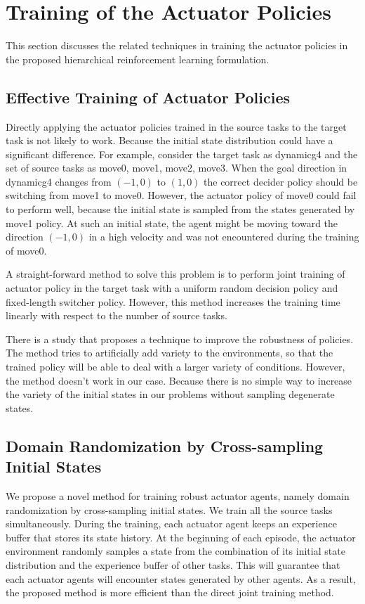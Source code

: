 \section{Training of the Actuator Policies}
This section discusses the related techniques in training the actuator policies in the proposed hierarchical reinforcement learning formulation.
\subsection{Effective Training of Actuator Policies}
Directly applying the actuator policies trained in the source tasks to the target task is not likely to work. Because the initial state distribution could have a significant difference.
For example, consider the target task as dynamicg4 and the set of source tasks as move0, move1, move2, move3. When the goal direction in dynamicg4 changes from $(-1,0)$ to $(1,0)$ the correct decider policy should be switching from move1 to move0. However, the actuator policy of move0 could fail to perform well, because the initial state is sampled from the states generated by move1 policy. At such an initial state, the agent might be moving toward the direction $(-1,0)$ in a high velocity and was not encountered during the training of move0.

A straight-forward method to solve this problem is to perform joint training of actuator policy in the target task with a uniform random decision policy and fixed-length switcher policy. However, this method increases the training time linearly with respect to the number of source tasks.

There is a study \cite{tobin2017domain} that proposes a technique to improve the robustness of policies. The method tries to artificially add variety to the environments, so that the trained policy will be able to deal with a larger variety of conditions. However, the method doesn't work in our case. Because there is no simple way to increase the variety of the initial states in our problems without sampling degenerate states. 

\subsection{Domain Randomization by Cross-sampling Initial States}
We propose a novel method for training robust actuator agents, namely domain randomization by cross-sampling initial states. We train all the source tasks simultaneously. During the training, each actuator agent keeps an experience buffer that stores its state history. At the beginning of each episode, the actuator environment randomly samples a state from the combination of its initial state distribution and the experience buffer of other tasks. This will guarantee that each actuator agents will encounter states generated by other agents. As a result, the proposed method is more efficient than the direct joint training method.
